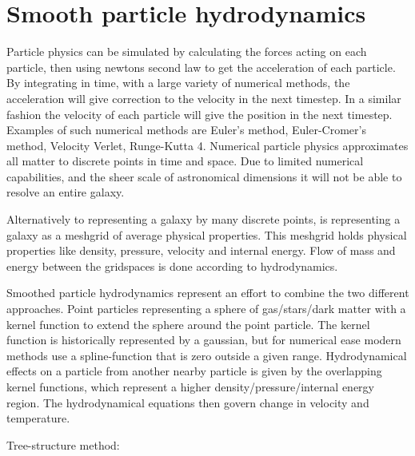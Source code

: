 \section{Smooth particle hydrodynamics}

Particle physics can be simulated by calculating the forces acting on each particle, then using newtons second law to get the acceleration of each particle.
By integrating in time, with a large variety of numerical methods, the acceleration will give correction to the velocity in the next timestep.
In a similar fashion the velocity of each particle will give the position in the next timestep.
Examples of such numerical methods are Euler's method, Euler-Cromer's method, Velocity Verlet, Runge-Kutta 4.
Numerical particle physics approximates all matter to discrete points in time and space. Due to limited numerical capabilities, and the sheer scale of astronomical dimensions it will not be able to resolve an entire galaxy.

Alternatively to representing a galaxy by many discrete points, is representing a galaxy as a meshgrid of average physical properties.
This meshgrid holds physical properties like density, pressure, velocity and internal energy. Flow of mass and energy between the gridspaces is done according to hydrodynamics.

Smoothed particle hydrodynamics represent an effort to combine the two different approaches. Point particles representing a sphere of gas/stars/dark matter with a kernel function to extend the sphere around the point particle.
The kernel function is historically represented by a gaussian, but for numerical ease modern methods use a spline-function that is zero outside a given range.
Hydrodynamical effects on a particle from another nearby particle is given by the overlapping kernel functions, which represent a higher density/pressure/internal energy region. The hydrodynamical equations then govern change in velocity and temperature.

Tree-structure method:

